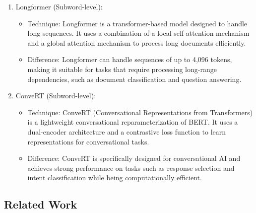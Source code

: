 \begin{enumerate}
\item Longformer (Subword-level):
\begin{itemize}
    \item Technique: Longformer is a transformer-based model designed to handle long sequences. It uses a combination of a local self-attention mechanism and a global attention mechanism to process long documents efficiently.
    \item Difference: Longformer can handle sequences of up to 4,096 tokens, making it suitable for tasks that require processing long-range dependencies, such as document classification and question answering.
\end{itemize}

\item ConveRT (Subword-level):
\begin{itemize}
    \item Technique: ConveRT (Conversational Representations from Transformers) is a lightweight conversational reparameterization of BERT. It uses a dual-encoder architecture and a contrastive loss function to learn representations for conversational tasks.
    \item Difference: ConveRT is specifically designed for conversational AI and achieves strong performance on tasks such as response selection and intent classification while being computationally efficient.
\end{itemize}
\end{enumerate}

\subsection{Related Work}


